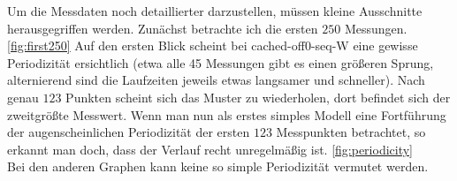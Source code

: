 \documentclass[
	12pt,
	a4paper,
	BCOR10mm,
	DIV14,
	listof=totoc,
	bibliography=totoc,
	headsepline
]{scrreprt}
\begin{document}
Um die Messdaten noch detaillierter darzustellen, müssen kleine Ausschnitte herausgegriffen werden. Zunächst betrachte ich die ersten $250$ Messungen. \ref{fig:first250}
Auf den ersten Blick scheint bei cached-off0-seq-W eine gewisse Periodizität ersichtlich (etwa alle 45 Messungen gibt es einen größeren Sprung, alternierend sind die Laufzeiten jeweils etwas langsamer und schneller). Nach genau $123$ Punkten scheint sich das Muster zu wiederholen, dort befindet sich der zweitgrößte Messwert. Wenn man nun als erstes simples Modell eine Fortführung der augenscheinlichen Periodizität der ersten $123$ Messpunkten betrachtet, so erkannt man doch, dass der Verlauf recht unregelmäßig ist. \ref{fig:periodicity} \\
Bei den anderen Graphen kann keine so simple Periodizität vermutet werden.
\end{document}
